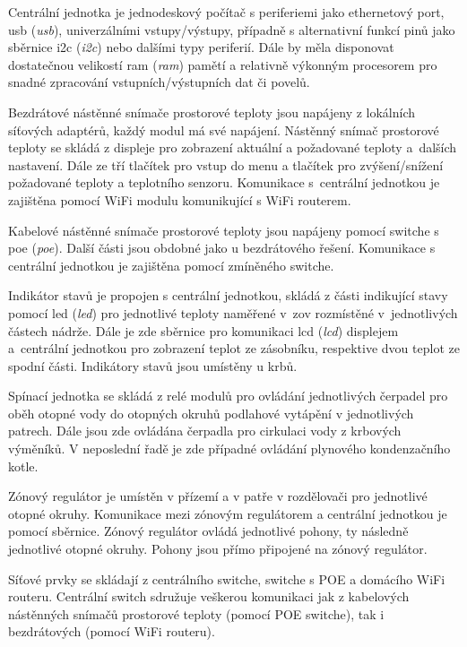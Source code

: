 Centrální jednotka je jednodeskový počítač s periferiemi jako ethernetový port, \acrshort{usb} (\textit{\acrlong{usb}}), univerzálními vstupy/výstupy, případně s alternativní funkcí pinů jako sběrnice \acrshort{i2c} (\textit{\acrlong{i2c}}) nebo dalšími typy periferií. Dále by měla disponovat dostatečnou velikostí \acrshort{ram} (\textit{\acrlong{ram}}) pamětí a relativně výkonným procesorem pro snadné zpracování vstupních/výstupních dat či povelů.

Bezdrátové nástěnné snímače prostorové teploty jsou napájeny z lokálních síťových adaptérů, každý modul má své napájení. Nástěnný snímač prostorové teploty se skládá z displeje pro zobrazení aktuální a požadované teploty a~dalších nastavení. Dále ze tří tlačítek pro vstup do menu a tlačítek pro zvýšení/snížení požadované teploty a teplotního senzoru. Komunikace s~centrální jednotkou je zajištěna pomocí WiFi modulu komunikující s WiFi routerem.

Kabelové nástěnné snímače prostorové teploty jsou napájeny pomocí switche s  \acrshort{poe} (\textit{\acrlong{poe}}). Další části jsou obdobné jako u bezdrátového řešení. Komunikace s centrální jednotkou je zajištěna pomocí zmíněného switche.

Indikátor stavů je propojen s centrální jednotkou, skládá z části indikující stavy pomocí \acrshort{led} (\textit{\acrlong{led}}) pro jednotlivé teploty naměřené v~\acrshort{zov} rozmístěné v~jednotlivých částech nádrže. Dále je zde sběrnice pro komunikaci \acrshort{lcd} (\textit{\acrlong{lcd}}) displejem a~centrální jednotkou pro zobrazení teplot ze zásobníku, respektive dvou teplot ze spodní části. Indikátory stavů jsou umístěny u krbů.

Spínací jednotka se skládá z relé modulů pro ovládání jednotlivých čerpadel pro oběh otopné vody do otopných okruhů podlahové vytápění v jednotlivých patrech. Dále jsou zde ovládána čerpadla pro cirkulaci vody z krbových výměníků. V neposlední řadě je zde případné ovládání plynového kondenzačního kotle.

Zónový regulátor je umístěn v přízemí a v patře v rozdělovači pro jednotlivé otopné okruhy. Komunikace mezi zónovým regulátorem a centrální jednotkou je pomocí sběrnice. Zónový regulátor ovládá jednotlivé pohony, ty následně jednotlivé otopné okruhy. Pohony jsou přímo připojené na zónový regulátor.

Síťové prvky se skládají z centrálního switche, switche s POE a domácího WiFi routeru. Centrální switch sdružuje veškerou komunikaci jak z kabelových nástěnných snímačů prostorové teploty (pomocí POE switche), tak i bezdrátových (pomocí WiFi routeru). 

